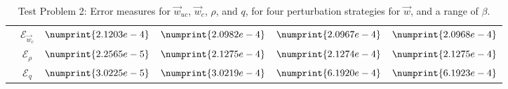 \documentclass[11pt, a4paper]{article}
\theoremstyle{definition}
\newcommand{\adj}{q}
\begin{document}
\begin{table}
\begin{tabular}{ | c | c || c | c | c | c ||}
		& $\mathcal{E}_{\vec{w}_c}$ & $\numprint{2.1203e-4}$ & $\numprint{2.0982e-4}$ & $\numprint{2.0967e-4}$ & $\numprint{2.0968e-4}$ \\
		& $\mathcal{E}_{\rho}$ & $\numprint{2.2565e-5}$ & $\numprint{2.1275e-4}$ & $\numprint{2.1274e-4}$ & $\numprint{2.1275e-4}$ \\
		& $\mathcal{E}_{\adj}$ & $\numprint{3.0225e-5}$ & $\numprint{3.0219e-4}$ & $\numprint{6.1920e-4}$ & $\numprint{6.1923e-4}$ \\
		\hline
	\end{tabular}
	\caption{Test Problem 2: Error measures for $\vec{w}_{uc}$, $\vec{w}_{c}$, $\rho$, and $\adj$, for four perturbation strategies for $\vec{w}$, and a range of $\beta$.}
	\label{TabA2:Prob1}
\end{table}
\end{document}
